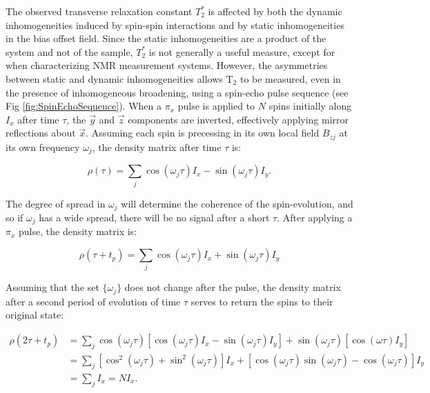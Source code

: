 \documentclass[PaulGanssle-Thesis.tex]{subfiles}
\begin{document}
The observed transverse relaxation constant $T_{2}^*$ is affected by both the dynamic inhomogeneities induced by spin-spin interactions and by static inhomogeneities in the bias offset field. Since the static inhomogeneities are a product of the system and not of the sample, $T_{2}^*$ is not generally a useful measure, except for when characterizing NMR measurement systems. However, the asymmetries between static and dynamic inhomogeneities allows $\mathrm{T}_{2}$ to be measured, even in the presence of inhomogeneous broadening, using a spin-echo pulse sequence (see Fig \ref{fig:SpinEchoSequence}). When a $\pi_{x}$ pulse is applied to $N$ spins initially along $I_{x}$ after time $\tau$, the $\vec{y}$ and $\vec{z}$ components are inverted, effectively applying mirror reflections about $\vec{x}$. Assuming each spin is precessing in its own local field $B_{zj}$ at its own frequency $\omega_{j}$, the density matrix after time $\tau$ is:

\begin{equation}
\label{eqn:InhomogeneouslyBroadenedSpinDensity}
\rho(\tau) = \sum_{j}\cos\left(\omega_{j}\tau\right)I_{x} - \sin\left(\omega_{j}\tau\right)I_{y}.
\end{equation}

The degree of spread in $\omega_{j}$ will determine the coherence of the spin-evolution, and so if $\omega_{j}$ has a wide spread, there will be no signal after a short $\tau$. After applying a $\pi_{x}$ pulse, the density matrix is:

\begin{equation}
\label{eqn:InhomogeneouslyBroadednedAfterPulse}
\rho(\tau+t_{p}) = \sum_{j}\cos\left(\omega_j\tau\right)I_{x} + \sin\left(\omega_{j}\tau\right)I_{y}
\end{equation}

Assuming that the set $\{\omega_{j}\}$ does not change after the pulse, the density matrix after a second period of evolution of time $\tau$ serves to return the spins to their original state:

\begin{align}
 \rho(2\tau+t_{p}) & =  \sum_{j}\cos\left(\omega_{j}\tau\right)\left[\cos\left(\omega_{j}\tau\right)I_{x} - \sin\left(\omega_{j}\tau\right)I_{y}\right] + \sin\left(\omega_{j}\tau\right)\left[\cos\left(\omega\tau\right)I_{y} \right] & \nonumber \\
 & =  \sum_{j}\left[\cos^{2}\left(\omega_{j}\tau\right) + \sin^{2}\left(\omega_{j}\tau\right)\right]I_{x} + \left[\cos\left(\omega_{j}\tau\right)\sin\left(\omega_{j}\tau\right) - \cos\left(\omega_{j}\tau\right)\right]I_{y} & \nonumber \\
 & =  \sum_{j}I_{x} = NI_{x}. &
\label{eqn:SpinRefocusAfter2Tau}
\end{align}
\end{document}
